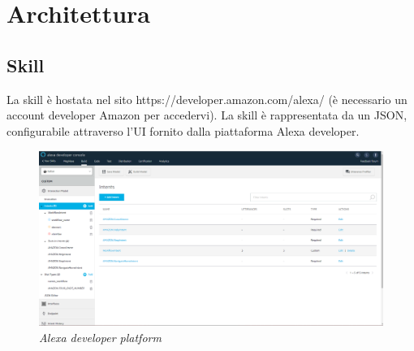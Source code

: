 \chapter{Architettura}
\section{Skill}\label{architetturaSkill}
La skill è hostata nel sito https://developer.amazon.com/alexa/ (è necessario un account developer Amazon per accedervi). La skill è rappresentata da un JSON, configurabile attraverso l'UI fornito dalla piattaforma Alexa developer.
\begin{figure} [H]
    \centering
	\includegraphics[scale=0.2]{./images/SkillPage.PNG}
	\caption{\textit{Alexa developer platform}}\label{classlambda}
\end{figure}


